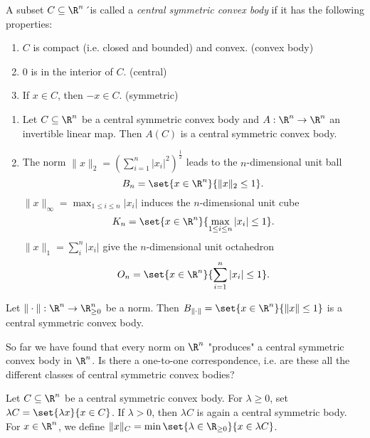 \begin{defn*}
	A subset \( C \subseteq \R^n \)´is called a \emph{central symmetric convex body} if it has the following properties:
	\begin{enumerate}[label=(\alph*)]
		\item \( C \) is compact (i.e. closed and bounded) and convex. (convex body)
		\item \( 0 \) is in the interior of \( C \). (central)
		\item If \( x \in C \), then \( -x \in C \). (symmetric)
	\end{enumerate}
\end{defn*}

\begin{exmp*}
	\begin{enumerate}
		\item Let \( C \subseteq \R^n \) be a central symmetric convex body and \( A: \R^n \to \R^n \) an invertible linear map.
			Then \( A(C) \) is a central symmetric convex body.
		\item The norm \( \|x\|_2 = \left( \sum_{i=1}^{n} |x_i|^2 \right)^\frac{1}{2} \) leads to the \( n \)-dimensional unit ball
			\[ B_n = \set{x \in \R^n}{\|x\|_2 \leq 1}. \]
			\( \|x\|_\infty = \max_{1 \leq i \leq n}|x_i| \) induces the \( n \)-dimensional unit cube
			\[ K_n = \set{x \in \R^n}{\max_{1 \leq i \leq n} |x_i| \leq 1}. \]
			\( \|x\|_1 = \sum_{i}^{n} |x_i| \) give the \( n \)-dimensional unit octahedron
			\[ O_n = \set{x \in \R^n}{\sum_{i=1}^{n}|x_i| \leq 1}. \]
	\end{enumerate}
\end{exmp*}

\begin{lem}
	Let \( \|\cdot\|: \R^n \to \R^n_{\geq 0} \) be a norm.
	Then \( B_{\|\cdot\|} = \set{x \in \R^n}{\| x \| \leq 1} \) is a central symmetric convex body.
\end{lem}

So far we have found that every norm on \( \R^n \) "produces" a central symmetric convex body in \( \R^n \).
Is there a one-to-one correspondence, i.e. are these all the different classes of central symmetric convex bodies?

\begin{rem*}
	Let \( C \subseteq \R^n \) be a central symmetric convex body.
	For \( \lambda \geq 0 \), set \( \lambda C = \set{\lambda x}{x \in C} \).
	If \( \lambda > 0 \), then \( \lambda C \) is again a central symmetric body.
	For \( x \in \R^n \), we define \( \|x\|_C = \min \set{\lambda \in \R_{\geq 0}}{x \in \lambda C} \).
\end{rem*}

